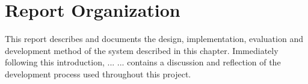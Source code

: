 \section{Report Organization}
This report describes and documents the design, implementation, evaluation and development method of the system described in this chapter. Immediately following this introduction,  ... \dummy ...  contains a discussion and reflection of the development process used throughout this project.